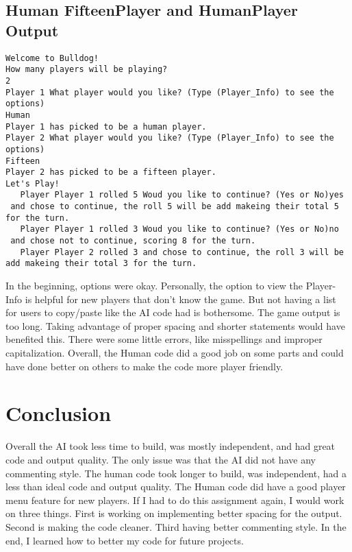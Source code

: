 \documentclass[a4paper,11pt]{article}
\begin{document}
\subsection*{Human FifteenPlayer and HumanPlayer Output}
\begin{verbatim}
Welcome to Bulldog!
How many players will be playing? 
2
Player 1 What player would you like? (Type (Player_Info) to see the options)
Human
Player 1 has picked to be a human player.
Player 2 What player would you like? (Type (Player_Info) to see the options)
Fifteen
Player 2 has picked to be a fifteen player.
Let's Play!
   Player Player 1 rolled 5 Woud you like to continue? (Yes or No)yes
 and chose to continue, the roll 5 will be add makeing their total 5 for the turn.
   Player Player 1 rolled 3 Woud you like to continue? (Yes or No)no
 and chose not to continue, scoring 8 for the turn.
   Player Player 2 rolled 3 and chose to continue, the roll 3 will be add makeing their total 3 for the turn.
\end{verbatim}
In the beginning, options were okay. Personally, the option to view the Player-Info is helpful for new players that don't know the game. But not having a list for users to copy/paste like the AI code had is bothersome. The game output is too long. Taking advantage of proper spacing and shorter statements would have benefited this. There were some little errors, like misspellings and improper capitalization. Overall, the Human code did a good job on some parts and could have done better on others to make the code more player friendly. 

\section*{Conclusion}
Overall the AI took less time to build, was mostly independent, and had great code and output quality. 
The only issue was that the AI did not have any commenting style. The human code took longer to build, was independent, had a less than ideal code and output quality. The Human code did have a good player menu feature for new players. If I had to do this assignment again, I would work on three things. First is working on implementing better spacing for the output. Second is making the code cleaner. Third having better commenting style. In the end, I learned how to better my code for future projects. 
\end{document}
